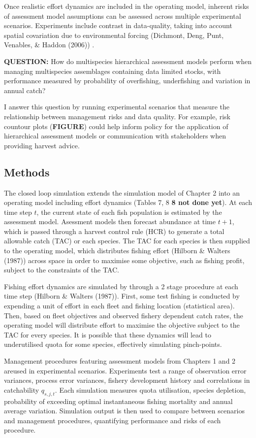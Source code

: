 \documentclass[12pt,]{scrartcl}
\begin{document}
Once realistic effort dynamics are included in the operating model,
inherent risks of assessment model assumptions can be assessed across
multiple experimental scenarios. Experiments include contrast in
data-quality, taking into account spatial covariation due to
environmental forcing (Dichmont, Deng, Punt, Venables, \& Haddon (2006))
.

\textbf{QUESTION:} How do multispecies hierarchical assessment models
perform when managing multispecies assemblages containing data limited
stocks, with performance measured by probability of overfishing,
underfishing and variation in annual catch?

I answer this question by running experimental scenarios that measure
the relationship between management risks and data quality. For example,
risk countour plots (\textbf{FIGURE}) could help inform policy for the
application of hierarchical assessment models or communication with
stakeholders when providing harvest advice.

\subsection{Methods}\label{methods-2}

The closed loop simulation extends the simulation model of Chapter 2
into an operating model including effort dynamics (Tables 7, 8 \textbf{8
not done yet}). At each time step \(t\), the current state of each fish
population is estimated by the assessment model. Asessment models then
forecast abundance at time \(t+1\), which is passed through a harvest
control rule (HCR) to generate a total allowable catch (TAC) or each
species. The TAC for each species is then supplied to the operating
model, which distributes fishing effort (Hilborn \& Walters (1987))
across space in order to maximise some objective, such as fishing
profit, subject to the constraints of the TAC.

Fishing effort dynamics are simulated by through a 2 stage procedure at
each time step (Hilborn \& Walters (1987)). First, some test fishing is
conducted by expending a unit of effort in each fleet and fishing
location (statistical area). Then, based on fleet objectives and
observed fishery dependent catch rates, the operating model will
distribute effort to maximise the objective subject to the TAC for every
species. It is possible that these dynamics will lead to underutilised
quota for some species, effectively simulating pinch-points.

Management procedures featuring assessment models from Chapters 1 and 2
areused in experimental scenarios. Experiments test a range of
observation error variances, process error variances, fishery
development history and correlations in catchability \(q_{s,j,t}\). Each
simulation measures quota utilisation, species depletion, probability of
exceeding optimal instantaneous fishing mortality and annual average
variation. Simulation output is then used to compare between scenarios
and management procedures, quantifying performance and risks of each
procedure.
\end{document}
